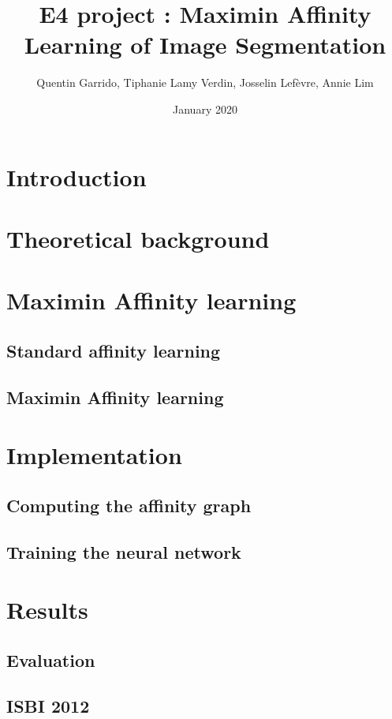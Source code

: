 \documentclass{article}
\title{E4 project : Maximin Affinity Learning of Image Segmentation}
\author{Quentin Garrido, Tiphanie Lamy Verdin, Josselin Lefèvre, Annie Lim}
\date{January 2020}
\begin{document}
\maketitle
\pagebreak
\tableofcontents
\pagebreak


\section{Introduction}

\clearpage
\section{Theoretical background}
\clearpage
\section{Maximin Affinity learning}
\subsection{Standard affinity learning}
\subsection{Maximin Affinity learning}
\clearpage
\section{Implementation}
\subsection{Computing the affinity graph}
\subsection{Training the neural network}
\clearpage
\section{Results}
\subsection{Evaluation}
\subsection{ISBI 2012}
\end{document}

